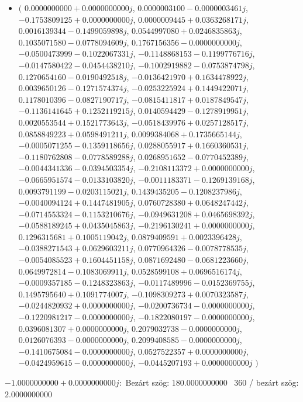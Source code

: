 \documentclass[14pt,a4paper]{article}
\begin{document}
\begin{itemize}
\item
$\big($
$0.0000000000+0.0000000000j$, $0.0000003100-0.0000003461j$, $-0.1753809125+0.0000000000j$, $0.0000009445+0.0363268171j$, $0.0016139344-0.1499059898j$, $0.0544997080+0.0246835863j$, $0.1035071580-0.0778094609j$, $0.1767156356-0.0000000000j$, $-0.0500473999-0.1022067331j$, $-0.1148868153-0.1199776716j$, $-0.0147580422-0.0454438210j$, $-0.1002919882-0.0753874798j$, $0.1270654160-0.0190492518j$, $-0.0136421970+0.1634478922j$, $0.0039650126-0.1271574374j$, $-0.0253225924+0.1449422071j$, $0.1178010396-0.0827190717j$, $-0.0815411817+0.0187849547j$, $-0.1136141645+0.1252119215j$, $0.0140594429-0.1278919951j$, $0.0020553544+0.1521773643j$, $-0.0518439976+0.0257128517j$, $0.0858849223+0.0598491211j$, $0.0099384068+0.1735665144j$, $-0.0005071255-0.1359118656j$, $0.0288055917+0.1660360531j$, $-0.1180762808-0.0778589288j$, $0.0268951652-0.0770452389j$, $-0.0044341336-0.0394503354j$, $-0.2108113372+0.0000000000j$, $-0.0665951574-0.0133103820j$, $-0.0011183371-0.1269139168j$, $0.0093791199-0.0203115021j$, $0.1439435205-0.1208237986j$, $-0.0040094124+0.1447481905j$, $0.0760728380+0.0648247442j$, $-0.0714553324-0.1153210676j$, $-0.0949631208+0.0465698392j$, $-0.0588189245+0.0435045863j$, $-0.2196130241+0.0000000000j$, $0.1296315681+0.1005119042j$, $0.0879409591+0.0023396428j$, $-0.0388271543+0.0629603211j$, $0.0770964326-0.0078778535j$, $-0.0054085523+0.1604451158j$, $0.0871692480-0.0681223660j$, $0.0649972814-0.1083069911j$, $0.0528599108+0.0696516174j$, $-0.0009357185-0.1248323863j$, $-0.0117489996-0.0152369755j$, $0.1495795640+0.1091774007j$, $-0.1098309273+0.0070323587j$, $-0.0244820932+0.0000000000j$, $-0.0200736734-0.0000000000j$, $-0.1220981217-0.0000000000j$, $-0.1822080197-0.0000000000j$, $0.0396081307+0.0000000000j$, $0.2079032738-0.0000000000j$, $0.0126076393-0.0000000000j$, $0.2099408585-0.0000000000j$, $-0.1410675084-0.0000000000j$, $0.0527522357+0.0000000000j$, $-0.0424959615-0.0000000000j$, $-0.0445207193+0.0000000000j$
$\big)$
\end{itemize}
$-1.0000000000+0.0000000000j$:\
Bezárt szög: $180.0000000000$ \
360 / bezárt szög: $2.0000000000$\
\end{document}
